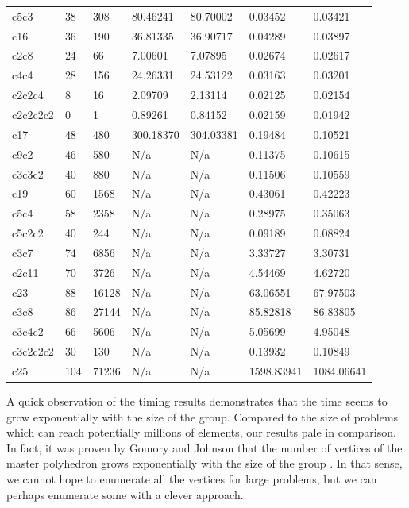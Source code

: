 \documentclass{article}
\begin{document}
\begin{table}[]
\begin{tabular}{@{}lllllll@{}}
			c5c3     & 38  & 308   & 80.46241  & 80.70002  & 0.03452    & 0.03421    \\
			c16      & 36  & 190   & 36.81335  & 36.90717  & 0.04289    & 0.03897    \\
			c2c8     & 24  & 66    & 7.00601   & 7.07895   & 0.02674    & 0.02617    \\
			c4c4     & 28  & 156   & 24.26331  & 24.53122  & 0.03163    & 0.03201    \\
			c2c2c4   & 8   & 16    & 2.09709   & 2.13114   & 0.02125    & 0.02154    \\
			c2c2c2c2 & 0   & 1     & 0.89261   & 0.84152   & 0.02159    & 0.01942    \\
			c17      & 48  & 480   & 300.18370 & 304.03381 & 0.19484    & 0.10521    \\
			c9c2     & 46  & 580   & N/a       & N/a       & 0.11375    & 0.10615    \\
			c3c3c2   & 40  & 880   & N/a       & N/a       & 0.11506    & 0.10559    \\
			c19      & 60  & 1568  & N/a       & N/a       & 0.43061    & 0.42223    \\
			c5c4     & 58  & 2358  & N/a       & N/a       & 0.28975    & 0.35063    \\
			c5c2c2   & 40  & 244   & N/a       & N/a       & 0.09189    & 0.08824    \\
			c3c7     & 74  & 6856  & N/a       & N/a       & 3.33727    & 3.30731    \\
			c2c11    & 70  & 3726  & N/a       & N/a       & 4.54469    & 4.62720    \\
			c23      & 88  & 16128 & N/a       & N/a       & 63.06551   & 67.97503   \\
			c3c8     & 86  & 27144 & N/a       & N/a       & 85.82818   & 86.83805   \\
			c3c4c2   & 66  & 5606  & N/a       & N/a       & 5.05699    & 4.95048    \\
			c3c2c2c2 & 30  & 130   & N/a       & N/a       & 0.13932    & 0.10849    \\
			c25      & 104 & 71236 & N/a       & N/a       & 1598.83941 & 1084.06641 \\ \bottomrule
		\end{tabular}
	\end{table}
	
	A quick observation of the timing results demonstrates that the time seems to grow exponentially with the size of the group. Compared to the size of problems which can reach potentially millions of elements, our results pale in comparison. In fact, it was proven by Gomory and Johnson that the number of vertices of the master polyhedron grows exponentially with the size of the group \cite{gomory1972some}. In that sense, we cannot hope to enumerate all the vertices for large problems, but we can perhaps enumerate some with a clever approach.
	
\end{document}
